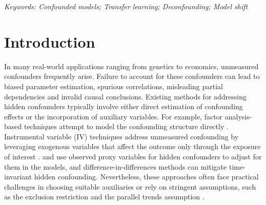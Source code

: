 \documentclass[12pt]{article}
\begin{document}
\noindent%
{\it Keywords: Confounded models; Transfer learning; Deconfounding; Model shift} 
\vfill

\newpage
{} %
\section{Introduction}

In many real-world applications ranging from genetics to economics, unmeasured confounders frequently arise. Failure to account for these confounders can lead to biased parameter estimation, spurious correlations, misleading partial dependencies and invalid causal conclusions.
Existing methods for addressing hidden confounders typically involve either direct estimation of confounding effects or the incorporation of auxiliary variables. For example, factor analysis-based techniques attempt to model the confounding structure directly \citep{cevid2020spectral,fan2021robust,guo2022doubly,bing2022adaptive,sun2024decorrelating}.  Instrumental variable (IV) techniques address unmeasured confounding by leveraging exogenous variables that affect the outcome only through the exposure of interest \citep{baiocchi2014instrumental, maciejewski2019using}.
\cite{miao2018identifying} and \cite{cui2024semiparametric} use observed proxy variables for hidden confounders to adjust for them in the models, and difference-in-differences methods \citep{donald2007inference,ding2019bracketing} can mitigate time-invariant hidden confounding. Nevertheless, these approaches often face practical challenges in choosing suitable auxiliaries or rely on stringent assumptions, such as the exclusion restriction and the parallel trends assumption \citep{martens2006instrumental,zhao2025semiparametric}. %
\end{document}
